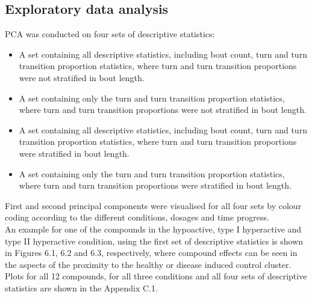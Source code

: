 \documentclass[a4paper,12pt]{article}
\begin{document}
\subsection{Exploratory data analysis}
PCA was conducted on four sets of descriptive statistics:
\begin{itemize}
\item A set containing all descriptive statistics, including bout count, turn and turn transition proportion statistics, where turn and turn transition proportions were not stratified in bout length.
\item A set containing only the turn and turn transition proportion statistics, where turn and turn transition proportions were not stratified in bout length.
\item A set containing all descriptive statistics, including bout count, turn and turn transition proportion statistics, where turn and turn transition proportions were stratified in bout length. 
\item A set containing only the turn and turn transition proportion statistics, where turn and turn transition proportions were stratified in bout length.
\end{itemize}
First and second principal components were visualised for all four sets by colour coding according to the different conditions, dosages and time progress. \\An example for one of the compounds in the hypoactive, type I hyperactive and type II hyperactive condition, using the first set of descriptive statistics is shown in Figures 6.1, 6.2 and 6.3, respectively, where compound effects can be seen in the aspects of the proximity to the healthy or disease induced control cluster. Plots for all 12 compounds, for all three conditions and all four sets of descriptive statistics are shown in the Appendix C.1.
\newpage
\end{document}
